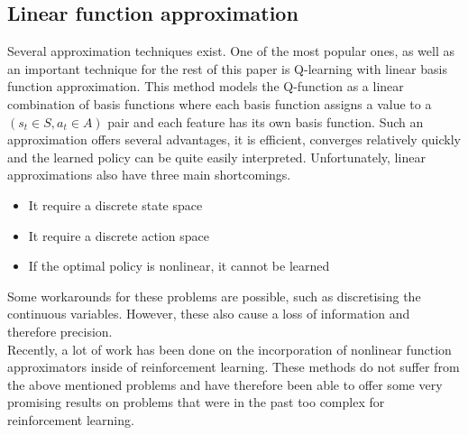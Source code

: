 \subsection{Linear function approximation}
Several approximation techniques exist. One of the most popular ones, as well as an important technique for the rest of this paper is Q-learning with linear basis function approximation. This method models the Q-function as a linear combination of basis functions where each basis function assigns a value to a $(s_t \in S,a_t \in A)$ pair and each feature has its own basis function. Such an approximation offers several advantages, it is efficient, converges relatively quickly and the learned policy can be quite easily interpreted. Unfortunately, linear approximations also have three main shortcomings.
\begin{itemize}
	\item It require a discrete state space
	\item It require a discrete action space
	\item If the optimal policy is nonlinear, it cannot be learned
\end{itemize}
Some workarounds for these problems are possible, such as discretising the continuous variables. However, these also cause a loss of information and therefore precision.\\
Recently, a lot of work has been done on the incorporation of nonlinear function approximators inside of reinforcement learning. These methods do not suffer from the above mentioned problems and have therefore been able to offer some very promising results on problems that were in the past too complex for reinforcement learning.
